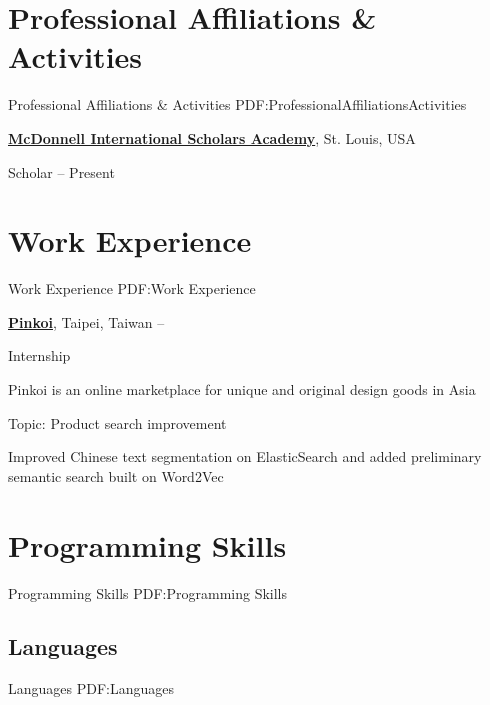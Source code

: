 \documentclass[a4paper,12pt,oneside]{article}
\begin{document}
\begin{body}

\section
{Professional Affiliations\newline
\& Activities}
{Professional Affiliations \& Activities}
{PDF:ProfessionalAffiliationsActivities}

\href{https://global.wustl.edu/mcdonnell-academy/}
{\textbf{McDonnell International Scholars Academy}},
St. Louis, USA
\par
Scholar
\hfill
{} --
Present


\section{Work Experience}
{Work Experience}
{PDF:Work Experience}

\href{http://pinkoi.com}
{\textbf{Pinkoi}},
Taipei, Taiwan
\hfill
{} --
\par
Internship
\begin{detail}
    \begin{detailitem}
    \item Pinkoi is an online marketplace for unique and original design goods in Asia
    \item Topic: Product search improvement
    \item Improved Chinese text segmentation on ElasticSearch and added
        preliminary semantic search built on Word2Vec
    \end{detailitem}
\end{detail}



\section{Programming Skills}
{Programming Skills}
{PDF:Programming Skills}

\subsection{Languages}
{Languages}
{PDF:Languages}


\end{body}
\end{document}
